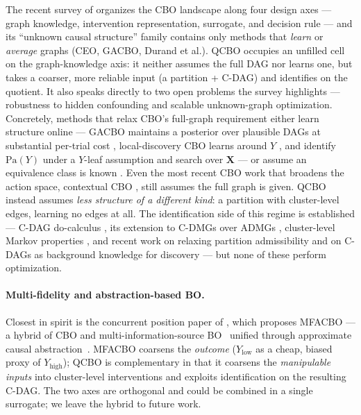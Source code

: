 \documentclass{article}
\newcommand{\Pa}{\mathrm{Pa}}
\newcommand{\QCBO}{\textsc{QCBO}}
\begin{document}
The recent survey of \citet{anonymous2026cbobench} organizes the CBO
landscape along four design axes --- graph knowledge, intervention
representation, surrogate, and decision rule --- and its ``unknown causal
structure'' family contains only methods that \emph{learn} or \emph{average}
graphs (CEO, GACBO, Durand et al.). \QCBO{} occupies an unfilled cell on the
graph-knowledge axis: it neither assumes the full DAG nor learns one, but
takes a coarser, more reliable input (a partition + C-DAG) and identifies on
the quotient. It also speaks directly to two open problems the survey
highlights --- robustness to hidden confounding and scalable unknown-graph
optimization. Concretely, methods that relax CBO's full-graph requirement
either learn structure online --- GACBO maintains a posterior over plausible
DAGs at substantial per-trial cost \citep{mukherjee2024gacbo}, local-discovery
CBO learns around $Y$ \citep{branchini2023causal}, and
\citet{durand2025unknown} identify $\Pa(Y)$ under a $Y$-leaf assumption and
search over $\mathbf{X}$ --- or assume an equivalence class is known
\citep{park2025dmis}. Even the most recent CBO work that broadens the action
space, contextual CBO \citep{arsenyan2026contextual}, still assumes the full
graph is given. \QCBO{} instead assumes \emph{less structure of a different
kind}: a partition with cluster-level edges, learning no edges at all. The
identification side of this regime is established --- C-DAG do-calculus
\citep{anand2023cdag}, its extension to C-DMGs over ADMGs
\citep{ferreira2025cdmg}, cluster-level Markov properties
\citep{wahl2024foundations}, and recent work on relaxing partition
admissibility \citep{tikka2025relaxing} and on C-DAGs as background knowledge
for discovery \citep{ll2025cdagdiscovery} --- but none of these perform
optimization.

\paragraph{Multi-fidelity and abstraction-based BO.}
Closest in spirit is the concurrent position paper of
\citet{zeitler2025mfacbo}, which proposes MFACBO --- a hybrid of CBO and
multi-information-source BO~\citep{poloczek2017multi} unified through
approximate causal abstraction~\citep{beckers2019approximate}. MFACBO
coarsens the \emph{outcome} ($Y_{\text{low}}$ as a cheap, biased proxy of
$Y_{\text{high}}$); \QCBO{} is complementary in that it coarsens the
\emph{manipulable inputs} into cluster-level interventions and exploits
identification on the resulting C-DAG. The two axes are orthogonal and
could be combined in a single surrogate; we leave the hybrid to future
work.
\end{document}
